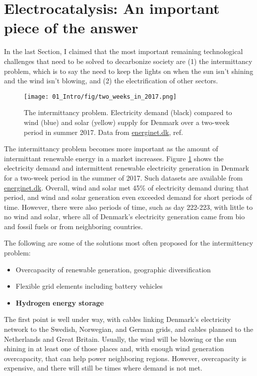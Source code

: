 
\section{Electrocatalysis: An important piece of the answer}\label{sec:our_part}

In the last Section, I claimed that the most important remaining technological challenges that need to be solved to decarbonize society are (1) the intermittancy problem, which is to say the need to keep the lights on when the sun isn't shining and the wind isn't blowing, and (2) the electrification of other sectors.

\begin{figure}[h!]
	\centering
	\texttt{[image: 01\_Intro/fig/two\_weeks\_in\_2017.png]}
	\caption{The intermittancy problem. Electricity demand (black) compared to wind (blue) and solar (yellow) supply for Denmark over a two-week period in summer 2017. Data from \url{energinet.dk}, ref. }
	\label{fig:intermittancy}
\end{figure}

The intermittancy problem becomes more important as the amount of intermittant renewable energy in a market increases. Figure \ref{fig:intermittancy} shows the electricity demand and intermittent renewable electricity generation in Denmark for a two-week period in the summer of 2017. Such datasets are available from \url{energinet.dk}. Overall, wind and solar met 45\% of electricity demand during that period, and wind and solar generation even exceeded demand for short periods of time. However, there were also periods of time, such as day 222-223, with little to no wind and solar, where all of Denmark's electricity generation came from bio and fossil fuels or from neighboring countries.

The following are some of the solutions most often proposed for the intermittency problem\cite{Budischak2013, Sgobbi2016, EU2018}:

\begin{itemize}
	\item Overcapacity of renewable generation, geographic diversification
	
	\item Flexible grid elements including battery vehicles
	
	\item \textbf{Hydrogen energy storage}
\end{itemize}

The first point is well under way, with cables linking Denmark's electricity network to the Swedish, Norwegian, and German grids, and cables planned to the Netherlands and Great Britain. Usually, the wind will be blowing or the sun shining in at least one of those places and, with enough wind generation overcapacity, that can help power neighboring regions. However, overcapacity is expensive, and there will still be times where demand is not met.

